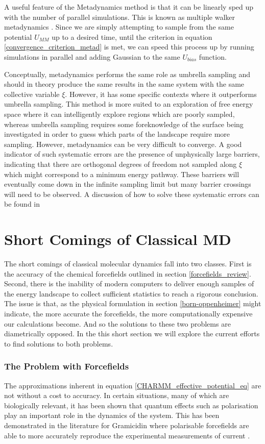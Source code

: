 A useful feature of the Metadynamics method is that it can be linearly sped up with the number of parallel simulations. This is known as multiple walker metadynamics \cite{raiteri2006}. Since we are simply attempting to sample from the same potential $U_{MM}$ up to a desired time, until the criterion in equation \ref{convergence_criterion_metad} is met, we can speed this process up by running simulations in parallel and adding Gaussian to the same $U_{bias}$ function.

Conceptually, metadynamics performs the same role as umbrella sampling and should in theory produce the same results in the same system with the same collective variable $\xi$. However, it has some specific contexts where it outperforms umbrella sampling. This method is more suited to an exploration of free energy space where it can intelligently explore regions which are poorly sampled, whereas umbrella sampling requires some foreknowledge of the surface being investigated in order to guess which parts of the landscape require more sampling. However, metadynamics can be very difficult to converge. A good indicator of such systematic errors are the presence of unphysically large barriers, indicating that there are orthogonal degrees of freedom not sampled along $\xi$ which might correspond to a minimum energy pathway. These barriers will eventually come down in the infinite sampling limit but many barrier crossings will need to be observed. A discussion of how to solve these systematic errors can be found in \cite{bussi2020a} 

\section{Short Comings of Classical MD}
The short comings of classical molecular dynamics fall into two classes. First is the accuracy of the chemical forcefields outlined in section \ref{forcefields_review}. Second, there is the inability of modern computers to deliver enough samples of the energy landscape to collect sufficient statistics to reach a rigorous conclusion. The issue is that, as the physical formulation in section \ref{born-oppenheimer} might indicate, the more accurate the forcefields, the more computationally expensive our calculations become. And so the solutions to these two problems are diametrically opposed. In the this short section we will explore the current efforts to find solutions to both problems.

\subsubsection{The Problem with Forcefields}
The approximations inherent in equation \ref{CHARMM_effective_potential_eq} are not without a cost to accuracy. In certain situations, many of which are biologically relevant, it has been shown that quantum effects such as polarisation play an important role in the dynamics of the system. This has been demonstrated in the literature for Gramicidin where polarisable forcefields are able to more accurately reproduce the experimental measurements of current \cite{ngo2021}.

